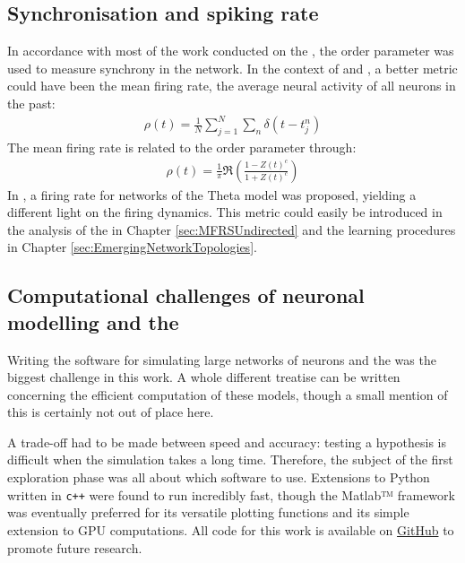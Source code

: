 \subsection{Synchronisation and spiking rate}
In accordance with most of the work conducted on the \MFR, the order parameter was used to measure synchrony in the network. In the context of \STDP and \IP, a better metric could have been the mean firing rate, the average neural activity of all neurons in the past:
\begin{align}
\rho(t)=\frac{1}{N} \sum_{j=1}^{N} \sum_{n} \delta\left(t-t_{j}^{n}\right)
\end{align}
The mean firing rate is related to the order parameter through:
\begin{align}
\rho(t) = \frac{1}{\pi} \Re \left(\frac{1-Z(t)^c}{1+Z(t)^c}\right)
\end{align}
In \cite{Montbrio2015}, a firing rate \MFR for networks of the Theta model was proposed, yielding a different light on the firing dynamics. This metric could easily be introduced in the analysis of the \MFR in Chapter \ref{sec:MFRSUndirected} and the learning procedures in Chapter \ref{sec:EmergingNetworkTopologies}.


\subsection{Computational challenges of neuronal modelling and the \MFR}
Writing the software for simulating large networks of neurons and the \MFR was the biggest challenge in this work. A whole different treatise can be written concerning the efficient computation of these models, though a small mention of this is certainly not out of place here.

A trade-off had to be made between speed and accuracy: testing a hypothesis is difficult when the simulation takes a long time. Therefore, the subject of the first exploration phase was all about which software to use. Extensions to Python written in \texttt{c++} were found to run incredibly fast, though the Matlab™ framework was eventually preferred for its versatile plotting functions and its simple extension to GPU computations. 
All code for this work is available on \href{https://github.com/simonaertssen/AdaptiveNeuronalNetworks}{GitHub} to promote future research. 


